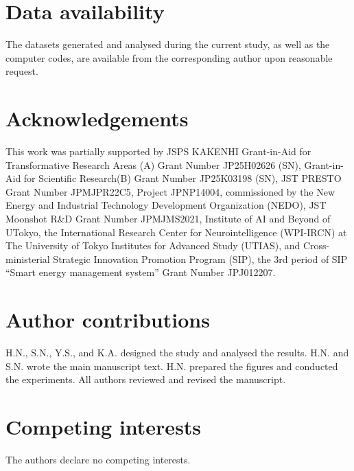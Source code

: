 \documentclass[pdflatex,sn-nature]{sn-jnl}
\theoremstyle{thmstyleone}%
\theoremstyle{thmstyletwo}%
\theoremstyle{thmstylethree}%
\begin{document}
\section*{Data availability}
The datasets generated and analysed during the current study, as well as the computer codes, are available from the corresponding author upon reasonable request.



\section*{Acknowledgements}
This work was partially supported by JSPS KAKENHI Grant-in-Aid for Transformative Research Areas (A) Grant Number JP25H02626 (SN), Grant-in-Aid for Scientific Research(B) Grant Number JP25K03198 (SN), JST PRESTO Grant Number JPMJPR22C5,
Project JPNP14004, commissioned by the New Energy and Industrial Technology Development Organization (NEDO),
JST Moonshot R\&D Grant Number JPMJMS2021, 
Institute of AI and Beyond of UTokyo, 
the International Research Center for Neurointelligence (WPI-IRCN) at The University of Tokyo Institutes for Advanced Study (UTIAS), 
and Cross-ministerial Strategic Innovation Promotion Program (SIP), the 3rd period of SIP ``Smart energy management system'' Grant Number JPJ012207.


\section*{Author contributions}
H.N., S.N., Y.S., and K.A. designed the study and analysed the results. 
H.N. and S.N. wrote the main manuscript text. 
H.N. prepared the figures and conducted the experiments. 
All authors reviewed and revised the manuscript.

\section*{Competing interests}
The authors declare no competing interests.
\end{document}
